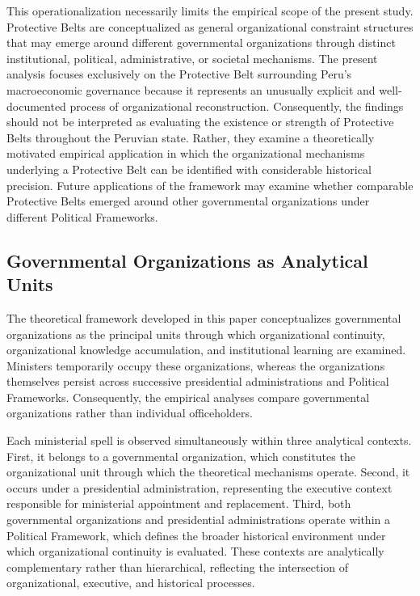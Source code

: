 \documentclass[doc, 12pt, a4paper,floatsintext]{apa7}
\begin{document}
This operationalization necessarily limits the empirical scope of the present study. Protective Belts are conceptualized as general organizational constraint structures that may emerge around different governmental organizations through distinct institutional, political, administrative, or societal mechanisms. The present analysis focuses exclusively on the Protective Belt surrounding Peru's macroeconomic governance because it represents an unusually explicit and well-documented process of organizational reconstruction. Consequently, the findings should not be interpreted as evaluating the existence or strength of Protective Belts throughout the Peruvian state. Rather, they examine a theoretically motivated empirical application in which the organizational mechanisms underlying a Protective Belt can be identified with considerable historical precision. Future applications of the framework may examine whether comparable Protective Belts emerged around other governmental organizations under different Political Frameworks.


\subsection{Governmental Organizations as Analytical Units}

The theoretical framework developed in this paper conceptualizes governmental organizations as the principal units through which organizational continuity, organizational knowledge accumulation, and institutional learning are examined. Ministers temporarily occupy these organizations, whereas the organizations themselves persist across successive presidential administrations and Political Frameworks. Consequently, the empirical analyses compare governmental organizations rather than individual officeholders.

Each ministerial spell is observed simultaneously within three analytical contexts. First, it belongs to a governmental organization, which constitutes the organizational unit through which the theoretical mechanisms operate. Second, it occurs under a presidential administration, representing the executive context responsible for ministerial appointment and replacement. Third, both governmental organizations and presidential administrations operate within a Political Framework, which defines the broader historical environment under which organizational continuity is evaluated. These contexts are analytically complementary rather than hierarchical, reflecting the intersection of organizational, executive, and historical processes.
\end{document}
